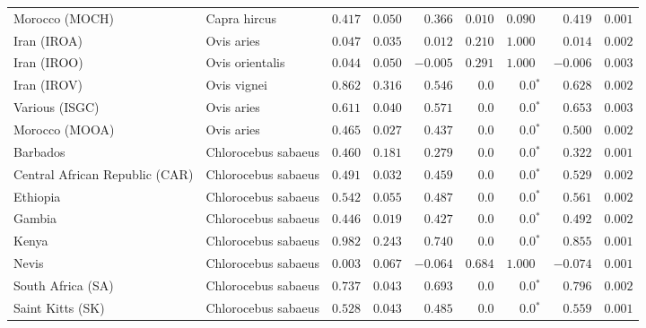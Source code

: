 \begin{center}
\begin{adjustbox}{width = 1\textwidth}
\begin{tabular}{|l|l|r|r|r|r|r|r|r|}
            Morocco (MOCH)                    & Capra hircus     & $ 0.417$ & $ 0.050$ & $ 0.366$ & $ 0.010$ & $ 0.090~~$     & $ 0.419$ & $ 0.001$ \\
            Iran (IROA)                    & Ovis aries         & $ 0.047$ & $ 0.035$ & $ 0.012$ & $ 0.210$    & $ 1.000~~$ & $ 0.014$ & $ 0.002$ \\
            Iran (IROO)                 & Ovis orientalis          & $ 0.044$ & $ 0.050$ & $-0.005$ & $ 0.291$    & $ 1.000~~$ & $-0.006$ & $ 0.003$ \\
            Iran (IROV)                 & Ovis vignei          & $ 0.862$ & $ 0.316$ & $ 0.546$ & $0.0$    & $\bm{0.0{^*}}$ & $ 0.628$ & $ 0.002$ \\
            Various (ISGC)                       & Ovis aries & $ 0.611$ & $ 0.040$ & $ 0.571$ & $0.0$    & $\bm{0.0{^*}}$ & $ 0.653$ & $ 0.003$ \\
            Morocco (MOOA) & Ovis aries & $ 0.465$ & $ 0.027$ & $ 0.437$ & $0.0$ & $\bm{0.0{^*}}$ & $ 0.500$ & $ 0.002$ \\
            Barbados                       & Chlorocebus sabaeus & $ 0.460$ & $ 0.181$ & $ 0.279$ & $0.0$    & $\bm{0.0{^*}}$ & $ 0.322$ & $ 0.001$ \\
            Central African Republic (CAR)                         & Chlorocebus sabaeus & $ 0.491$ & $ 0.032$ & $ 0.459$ & $0.0$    & $\bm{0.0{^*}}$ & $ 0.529$ & $ 0.002$ \\
            Ethiopia                          & Chlorocebus sabaeus & $ 0.542$ & $ 0.055$ & $ 0.487$ & $0.0$    & $\bm{0.0{^*}}$ & $ 0.561$ & $ 0.002$ \\
            Gambia                          & Chlorocebus sabaeus & $ 0.446$ & $ 0.019$ & $ 0.427$ & $0.0$ & $\bm{0.0{^*}}$     & $ 0.492$ & $ 0.002$ \\
            Kenya              & Chlorocebus sabaeus & $ 0.982$ & $ 0.243$ & $ 0.740$ & $0.0$    & $\bm{0.0{^*}}$ & $ 0.855$ & $ 0.001$ \\
            Nevis               & Chlorocebus sabaeus & $ 0.003$ & $ 0.067$ & $-0.064$ & $ 0.684$    & $ 1.000~~$ & $-0.074$ & $ 0.001$ \\
            South Africa (SA)                         & Chlorocebus sabaeus & $ 0.737$ & $ 0.043$ & $ 0.693$ & $0.0$    & $\bm{0.0{^*}}$ & $ 0.796$ & $ 0.002$ \\
            Saint Kitts (SK)                  & Chlorocebus sabaeus        & $ 0.528$ & $ 0.043$ & $ 0.485$ & $0.0$    & $\bm{0.0{^*}}$ & $ 0.559$ & $ 0.001$ \\

\end{tabular}
\end{adjustbox}
\end{center}
